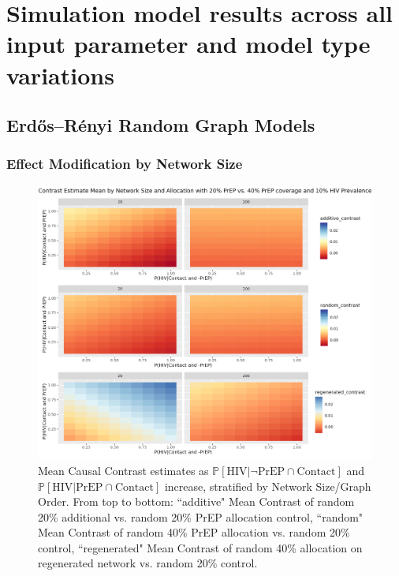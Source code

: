 \documentclass{article}
\theoremstyle{definition}
\begin{document}
\newpage

\section{Simulation model results across all input parameter and model type variations}
\label{Appendix 5}

\subsection{Erdős–Rényi  Random Graph Models}

\subsubsection{Effect Modification by Network Size}
\begin{figure}[H]
    \centering
    \includegraphics[width=\linewidth]{Corrected Figures/Network Size Mean Plot.png}
    \caption{Mean Causal Contrast estimates as $\mathbb{P}\left[\text{HIV} \vert \neg \text{PrEP} \cap \text{Contact}\right]$ and $\mathbb{P}\left[\text{HIV} \vert \text{PrEP} \cap \text{Contact}\right]$ increase, stratified by Network Size/Graph Order. From top to bottom: ``additive" Mean Contrast of random 20\% additional vs. random 20\% PrEP allocation control, ``random" Mean Contrast of random 40\% PrEP allocation vs. random 20\% control, ``regenerated" Mean Contrast of random 40\% allocation on regenerated network vs. random 20\% control. }
    \label{fig: Figure S4.1}
\end{figure}
\end{document}
